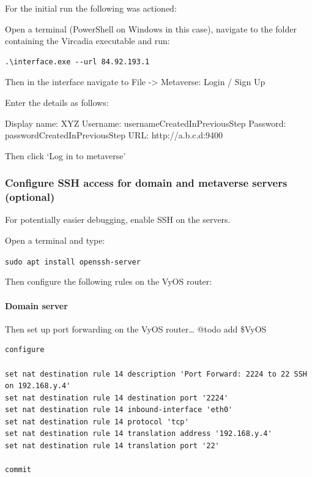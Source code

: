 For the initial run the following was actioned:

Open a terminal (PowerShell on Windows in this case), navigate to the
folder containing the Vircadia executable and run:

\begin{verbatim}
.\interface.exe --url 84.92.193.1
\end{verbatim}

Then in the interface navigate to File -\textgreater{} Metaverse: Login
/ Sign Up

Enter the details as follows:

Display name: XYZ Username: usernameCreatedInPreviousStep Password:
passwordCreatedInPreviousStep URL: http://a.b.c.d:9400

Then click `Log in to metaverse'

\hypertarget{configure-ssh-access-for-domain-and-metaverse-servers-optional}{%
\subsubsection{Configure SSH access for domain and metaverse servers
(optional)}\label{configure-ssh-access-for-domain-and-metaverse-servers-optional}}

For potentially easier debugging, enable SSH on the servers.

Open a terminal and type:

\texttt{sudo\ apt\ install\ openssh-server}

Then configure the following rules on the VyOS router:

\hypertarget{domain-server}{%
\paragraph{Domain server}\label{domain-server}}

Then set up port forwarding on the VyOS router\ldots{} @todo add \$VyOS

\begin{verbatim}
configure

set nat destination rule 14 description 'Port Forward: 2224 to 22 SSH on 192.168.y.4'
set nat destination rule 14 destination port '2224'
set nat destination rule 14 inbound-interface 'eth0'
set nat destination rule 14 protocol 'tcp'
set nat destination rule 14 translation address '192.168.y.4'
set nat destination rule 14 translation port '22'

commit
\end{verbatim}

